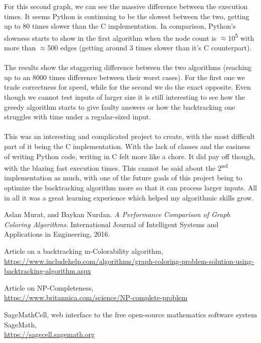 \documentclass[12pt]{article}
\begin{document}
\indent For this second graph, we can see the massive difference between the execution times. It seems Python is continuing to be the slowest between the two, getting up to 80 times slower than the C implementation. In comparison, Python's slowness starts to show in the first algorithm when the node count is $\approx$10\textsuperscript{5} with more than $\approx$500 edges (getting around 3 times slower than it's C counterpart).\\ \\ \indent The results show the staggering difference between the two algorithms (reaching up to an 8000 times difference between their worst cases). For the first one we trade correctness for speed, while for the second we do the exact opposite. Even though we cannot test inputs of larger size it is still interesting to see how the greedy algorithm starts to give faulty answers or how the backtracking one struggles with time under a regular-sized input. \\ \\
\indent This was an interesting and complicated project to create, with the most difficult part of it being the C implementation. With the lack of classes and the easiness of writing Python code, writing in C felt more like a chore. It did pay off though, with the blazing fast execution times. This cannot be said about the 2\textsuperscript{nd} implementation as much, with one of the future goals of this project being to optimize the backtracking algorithm more so that it can process larger inputs. All in all it was a great learning experience which helped my algorithmic skills grow.
\begin{thebibliography}{9}
Aslan Murat, and Baykan Nurdan. 
\textit{A Performance Comparison of Graph Coloring Algorithms}. 
International Journal of Intelligent Systems and Applications in Engineering, 2016.

Article on a backtracking m-Colorability algorithm,
\\\url{https://www.includehelp.com/algorithms/graph-coloring-problem-solution-using-backtracking-algorithm.aspx}

Article on NP-Completeness,
\\\url{https://www.britannica.com/science/NP-complete-problem}

SageMathCell, web interface to the free open-source mathematics software system SageMath,
\\\url{https://sagecell.sagemath.org}

\end{thebibliography}
\end{document}
